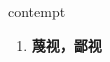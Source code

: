 
\begin{frame}
{\huge contempt}
\begin{center}
\begin{enumerate}\Large
  \item \textbf{蔑视，鄙视}
\end{enumerate}
\end{center}
\end{frame}

